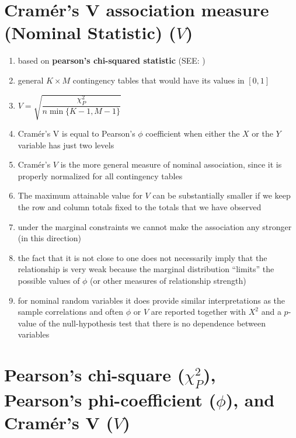 \section{Cramér’s V association measure (Nominal Statistic) ($V$) \cite{ism-1}} \label{Multivariate Distributions: Cramer’s V association measure (Nominal Statistic)}


\begin{enumerate}
    \item based on \textbf{pearson’s chi-squared statistic} (SEE: )

    \item general $K \times  M$ contingency tables that would have its values in $[0, 1]$

    \item $
        V = \sqrt{\dfrac{\chi_P^2}{
        n\min\{K-1,M-1\}
        }}
    $

    \item Cramér’s V is equal to Pearson’s $\phi$ coefficient when either the $X$ or the $Y$ variable has just two levels

    \item Cramér’s $V$ is the more general measure of nominal association, since it is properly normalized for all contingency tables

    \item The maximum attainable value for $V$ can be substantially smaller if we keep the row and column totals fixed to the totals that we have observed

    \item under the marginal constraints we cannot make the association any stronger (in this direction)

    \item the fact that it is not close to one does not necessarily imply that the relationship is very weak because the marginal distribution “limits” the possible values of $\phi$ (or other measures of relationship strength)

    \item for nominal random variables it does provide similar interpretations as the sample correlations and often $\phi$ or $V$ are reported together with $X^2$ and a $p$-value of the null-hypothesis test that there is no dependence between variables
\end{enumerate}


\section{Pearson’s chi-square ($\chi_P^2$), Pearson’s phi-coefficient ($\phi$), and Cramér’s V ($V$) \cite{ism-1}} \label{Multivariate Distributions: Pearson’s chi-square, Pearson’s phi-coefficient, and Cramér’s V}

